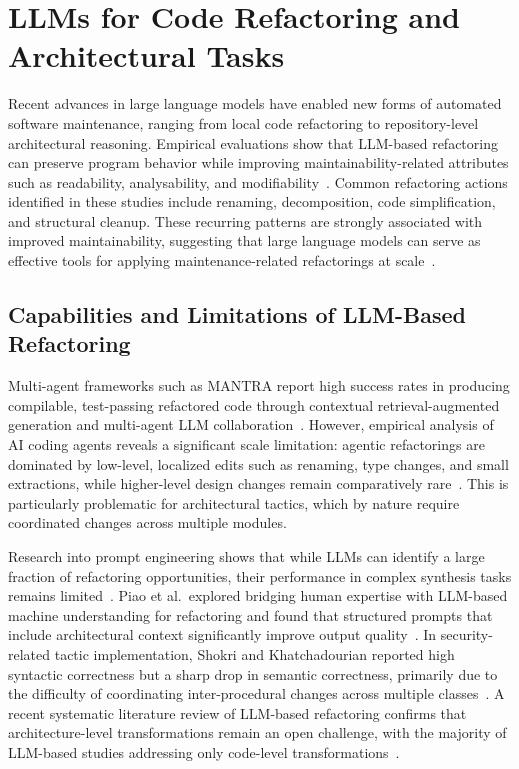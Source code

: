 \section{LLMs for Code Refactoring and Architectural Tasks}

Recent advances in large language models have enabled new forms of automated software maintenance, ranging from local code refactoring to repository-level architectural reasoning. Empirical evaluations show that LLM-based refactoring can preserve program behavior while improving maintainability-related attributes such as readability, analysability, and modifiability~\cite{depalma2024exploring}. Common refactoring actions identified in these studies include renaming, decomposition, code simplification, and structural cleanup. These recurring patterns are strongly associated with improved maintainability, suggesting that large language models can serve as effective tools for applying maintenance-related refactorings at scale~\cite{depalma2024exploring}.

\subsection{Capabilities and Limitations of LLM-Based Refactoring}

Multi-agent frameworks such as MANTRA report high success rates in producing compilable, test-passing refactored code through contextual retrieval-augmented generation and multi-agent LLM collaboration~\cite{xu2025mantra}. However, empirical analysis of AI coding agents reveals a significant scale limitation: agentic refactorings are dominated by low-level, localized edits such as renaming, type changes, and small extractions, while higher-level design changes remain comparatively rare~\cite{horikawa2025agentic}. This is particularly problematic for architectural tactics, which by nature require coordinated changes across multiple modules.

Research into prompt engineering shows that while LLMs can identify a large fraction of refactoring opportunities, their performance in complex synthesis tasks remains limited~\cite{liu2025exploring}. Piao et al.\ explored bridging human expertise with LLM-based machine understanding for refactoring and found that structured prompts that include architectural context significantly improve output quality~\cite{piao2025refactoring}. In security-related tactic implementation, Shokri and Khatchadourian reported high syntactic correctness but a sharp drop in semantic correctness, primarily due to the difficulty of coordinating inter-procedural changes across multiple classes~\cite{shokri2024ipsynth}. A recent systematic literature review of LLM-based refactoring confirms that architecture-level transformations remain an open challenge, with the majority of LLM-based studies addressing only code-level transformations~\cite{martinez2025refactoring}.

